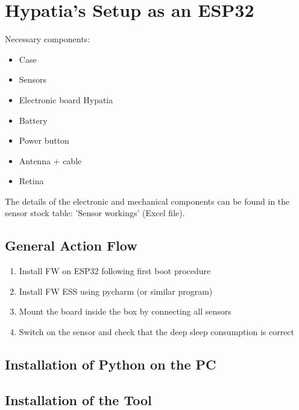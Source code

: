 %
%
%


\chapter{Hypatia's Setup as an ESP32}


Necessary components:

\begin{itemize}
  \item Case
  \item Sensors 
  \item Electronic board Hypatia
  \item Battery
  \item Power button
  \item  Antenna + cable
  \item  Retina
\end{itemize}

\bigskip

The details of the electronic and mechanical components can be found in the sensor stock table: 'Sensor workings' (Excel file).


\section{General Action Flow}


\begin{enumerate}
  \item Install FW on ESP32 following first boot procedure
  \item Install FW ESS using pycharm (or similar program)
  \item Mount the board inside the box by connecting all sensors
  \item Switch on the sensor and check that the deep sleep consumption is correct
\end{enumerate}


\section{Installation of Python on the PC}


\section{Installation of the Tool }

